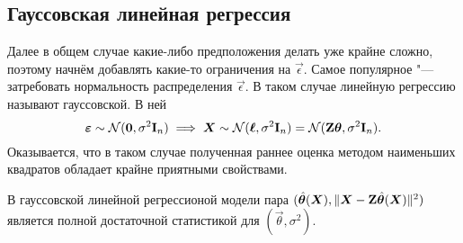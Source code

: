 \subsection{Гауссовская линейная регрессия}
Далее в общем случае какие-либо предположения делать уже крайне сложно, поэтому начнём добавлять какие-то ограничения на $\vec{\epsilon}$. Самое популярное "--- затребовать нормальность распределения $\vec{\epsilon}$. В таком случае линейную регрессию называют гауссовской. В ней
\[
	\bm{\varepsilon} \sim \mathcal{N}(\bm{0}, \sigma^{2}\mathbf{I}_{n})
	\implies
	\bm{X} 
	\sim \mathcal{N}(\bm{\ell}, \sigma^{2}\mathbf{I}_{n})
	= \mathcal{N}(\mathbf{Z}\bm{\theta}, \sigma^{2}\mathbf{I}_{n}).
\]
Оказывается, что в таком случае полученная раннее оценка методом наименьших квадратов обладает крайне приятными свойствами.
\begin{theorem}
	В гауссовской линейной регрессионой модели пара $(\hat{\bm{\theta}}(\bm{X}), \|\bm{X} - \mathbf{Z}\hat{\bm{\theta}}(\bm{X})\|^{2})$ является полной достаточной статистикой для $(\vec{\theta}, \sigma^{2})$.
\end{theorem}
